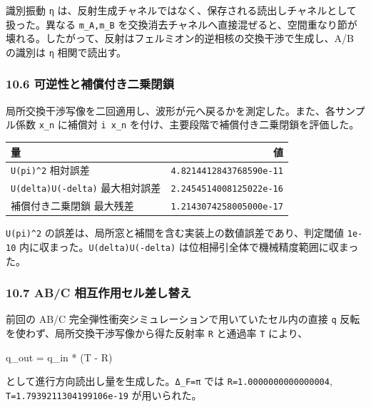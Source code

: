 \documentclass[
  a4paper,
]{article}
\newenvironment{Shaded}{}{}
\newcommand{\NormalTok}[1]{#1}
\newcounter{none} %
\begin{document}
識別振動 \texttt{η}
は、反射生成チャネルではなく、保存される読出しチャネルとして扱った。異なる
\texttt{m\_A,m\_B}
を交換消去チャネルへ直接混ぜると、空間重なり節が壊れる。したがって、反射はフェルミオン的逆相核の交換干渉で生成し、A/B
の識別は \texttt{η} 相関で読出す。

\subsubsection{10.6
可逆性と補償付き二乗閉鎖}\label{ux53efux9006ux6027ux3068ux88dcux511fux4ed8ux304dux4e8cux4e57ux9589ux9396}

局所交換干渉写像を二回適用し、波形が元へ戻るかを測定した。また、各サンプル係数
\texttt{x\_n} に補償対 \texttt{i\ x\_n}
を付け、主要段階で補償付き二乗閉鎖を評価した。

{\def\LTcaptype{none} %
\begin{longtable}[]{@{}lr@{}}
\toprule\noalign{}
量 & 値 \\
\midrule\noalign{}
\endhead
\bottomrule\noalign{}
\endlastfoot
\texttt{U(pi)\^{}2} 相対誤差 & \texttt{4.8214412843768590e-11} \\
\texttt{U(delta)U(-delta)} 最大相対誤差 &
\texttt{2.2454514008125022e-16} \\
補償付き二乗閉鎖 最大残差 & \texttt{1.2143074258005000e-17} \\
\end{longtable}
}

\texttt{U(pi)\^{}2}
の誤差は、局所窓と補間を含む実装上の数値誤差であり、判定閾値
\texttt{1e-10} 内に収まった。\texttt{U(delta)U(-delta)}
は位相掃引全体で機械精度範囲に収まった。

\subsubsection{10.7 AB/C
相互作用セル差し替え}\label{abc-ux76f8ux4e92ux4f5cux7528ux30bbux30ebux5deeux3057ux66ffux3048}

前回の AB/C 完全弾性衝突シミュレーションで用いていたセル内の直接
\texttt{q} 反転を使わず、局所交換干渉写像から得た反射率 \texttt{R}
と通過率 \texttt{T} により、

\begin{Shaded}
\begin{Highlighting}[]
\NormalTok{q\_out = q\_in * (T {-} R)}
\end{Highlighting}
\end{Shaded}

として進行方向読出し量を生成した。\texttt{Δ\_F=π} では
\texttt{R=1.0000000000000004}, \texttt{T=1.7939211304199106e-19}
が用いられた。
\end{document}
